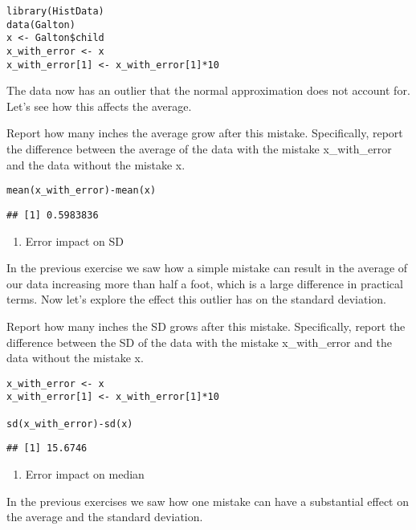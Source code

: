 \documentclass[]{article}
\providecommand{\tightlist}{%
  \setlength{\itemsep}{0pt}\setlength{\parskip}{0pt}}
\begin{document}
\begin{verbatim}
library(HistData)
data(Galton)
x <- Galton$child
x_with_error <- x
x_with_error[1] <- x_with_error[1]*10
\end{verbatim}

The data now has an outlier that the normal approximation does not
account for. Let's see how this affects the average.

Report how many inches the average grow after this mistake.
Specifically, report the difference between the average of the data with
the mistake x\_with\_error and the data without the mistake x.

\begin{verbatim}
mean(x_with_error)-mean(x)
\end{verbatim}

\begin{verbatim}
## [1] 0.5983836
\end{verbatim}

\begin{enumerate}
\def\labelenumi{\arabic{enumi}.}
\setcounter{enumi}{3}
\tightlist
\item
  Error impact on SD
\end{enumerate}

In the previous exercise we saw how a simple mistake can result in the
average of our data increasing more than half a foot, which is a large
difference in practical terms. Now let's explore the effect this outlier
has on the standard deviation.

Report how many inches the SD grows after this mistake. Specifically,
report the difference between the SD of the data with the mistake
x\_with\_error and the data without the mistake x.

\begin{verbatim}
x_with_error <- x
x_with_error[1] <- x_with_error[1]*10

sd(x_with_error)-sd(x)
\end{verbatim}

\begin{verbatim}
## [1] 15.6746
\end{verbatim}

\begin{enumerate}
\def\labelenumi{\arabic{enumi}.}
\setcounter{enumi}{4}
\tightlist
\item
  Error impact on median
\end{enumerate}

In the previous exercises we saw how one mistake can have a substantial
effect on the average and the standard deviation.
\end{document}
